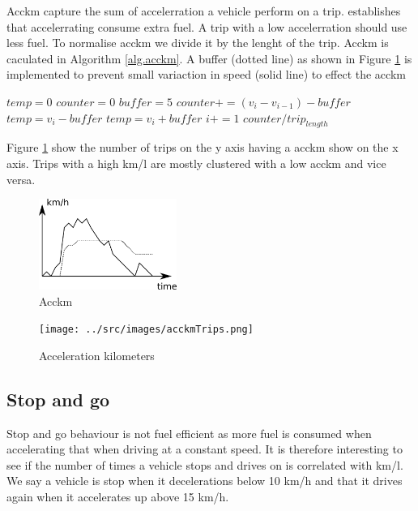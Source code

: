 Acckm capture the sum of accelerration a vehicle perform on a trip. \cite{} establishes that accelerrating consume extra fuel. A trip with a low accelerration should use less fuel. To normalise acckm we divide it by the lenght of the trip. Acckm is caculated in Algorithm \ref{alg.acckm}. A buffer (dotted line) as shown in Figure \ref{fig:acckm} is implemented to prevent small variaction in speed (solid line) to effect the acckm

\begin{algorithm}
\caption{$acckm$}\label{alg.acckm}
\begin{algorithmic}[1]
\State $temp = 0$
\State $counter = 0$
\State $buffer = 5$
	\State $counter += (v_i - v_{i-1}) - buffer$
	\State $temp = v_i - buffer$
	\State $temp = v_i + buffer$
\EndIf
\State $i+=1$
\EndWhile
\State \Return $ counter / trip_{length}$

\end{algorithmic}
\end{algorithm}

Figure \ref{fig:acckm} show the number of trips on the y axis having a acckm show on the x axis. Trips with a high km/l are mostly clustered with a low acckm and vice versa. 

\begin{figure}[htb]
\centering
\includegraphics[width=0.4\textwidth]{../images/acckm.png}
\caption{Acckm}
\label{fig:acckm}
\end{figure}

\begin{figure}
\centering
\texttt{[image: ../src/images/acckmTrips.png]}
\caption{Acceleration kilometers}
\label{fig:acckmTrips}
\end{figure}

\subsection{Stop and go}
Stop and go behaviour is not fuel efficient as more fuel is consumed when accelerating that when driving at a constant speed.
It is therefore interesting to see if the number of times a vehicle stops and drives on is correlated with km/l.
We say a vehicle is stop when it decelerations below 10 km/h and that it drives again when it accelerates up above 15 km/h.

